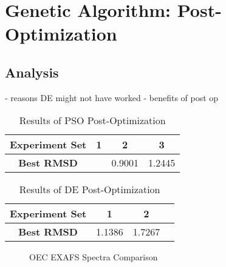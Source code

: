 \section{Genetic Algorithm: Post-Optimization}

\subsection{Analysis}

- reasons DE might not have worked
- benefits of post op

\begin{table}
	\centering
	\begin{tabular}{ | >{\bfseries}c | c | c | c | }
		\hline
		Experiment Set & 1 & 2 & 3 \\ \hline
		Best RMSD &  & 0.9001 & 1.2445 \\ \hline
	\end{tabular}
	\caption{Results of PSO Post-Optimization}
	\label{table:post-op-pso-results}
\end{table}

\begin{table}
	\centering
	\begin{tabular}{ | >{\bfseries}c | c | c | c | }
		\hline
		Experiment Set & 1 & 2 \\ \hline
		Best RMSD & 1.1386 &1.7267  \\ \hline
	\end{tabular}
	\caption{Results of DE Post-Optimization}
	\label{table:post-op-de-results}
\end{table}

\begin{figure*}
	\centering
	\caption{OEC EXAFS Spectra Comparison}
	\label{fig:bestRunEXAFS}
\end{figure*}